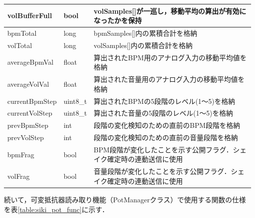 \begin{center}
\begin{longtable}{p{3.9cm}p{3.4cm}p{6.2cm}}
    volBufferFull & bool & volSamples[]が一巡し，移動平均の算出が有効になったかを保持\\
    \hline
    bpmTotal & long & bpmSamples[]内の累積合計を格納\\
    \hline
    volTotal & long & volSamples[]内の累積合計を格納\\
    \hline
    averageBpmVal & float & 算出されたBPM用のアナログ入力の移動平均値を格納\\
    \hline
    averageVolVal & float & 算出された音量用のアナログ入力の移動平均値を格納\\
    \hline
    currentBpmStep & uint8\_t & 算出されたBPMの5段階のレベル(1〜5)を格納\\
    \hline
    currentVolStep & uint8\_t & 算出された音量の5段階のレベル(1〜5)を格納\\
    \hline
    prevBpmStep & int & 段階の変化検知のための直前のBPM段階を格納\\
    \hline
    prevVolStep & int & 段階の変化検知のための直前の音量段階を格納\\
    \hline
    bpmFrag & bool & BPM段階が変化したことを示す公開フラグ．シェイク確定時の連動送信に使用\\
    \hline
    volFrag & bool & 音量段階が変化したことを示す公開フラグ．シェイク確定時の連動送信に使用\\
\end{longtable}
\end{center}



続いて，可変抵抗器読み取り機能（PotManagerクラス）で使用する関数の仕様を表\ref{table:siki_pot_func}に示す．

